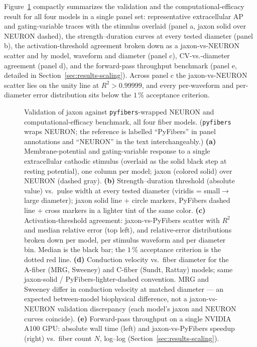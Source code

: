 Figure~\ref{fig:validation} compactly summarizes the validation and
the computational-efficacy result for all four models in a single
panel set: representative extracellular AP and gating-variable traces
with the stimulus overlaid (panel a, jaxon solid over NEURON dashed),
the strength--duration curves at every tested diameter (panel b),
the activation-threshold agreement broken down as a jaxon-vs-NEURON
scatter and by model, waveform and diameter (panel c),
CV-vs.-diameter agreement (panel d), and the forward-pass throughput
benchmark (panel e, detailed in Section~\ref{sec:results-scaling}).
Across panel c the jaxon-vs-NEURON scatter lies on the unity line at
$R^{2}>0.99999$, and every per-waveform and per-diameter error
distribution sits below the $1\,\%$ acceptance criterion.

\begin{figure}[h]
  \centering
  \caption{Validation of jaxon against \texttt{pyfibers}-wrapped NEURON
    and computational-efficacy benchmark, all four fiber models.
    (\texttt{pyfibers} wraps NEURON; the reference is labelled
    ``PyFibers'' in panel annotations and ``NEURON'' in the text
    interchangeably.)
    \textbf{(a)} Membrane-potential and gating-variable response to a
    single extracellular cathodic stimulus (overlaid as the solid
    black step at resting potential), one column per model; jaxon
    (colored solid) over NEURON (dashed gray).
    \textbf{(b)} Strength--duration threshold (absolute value) vs.\
    pulse width at every tested diameter (viridis = small$\to$large
    diameter); jaxon solid line + circle markers, PyFibers dashed line
    + cross markers in a lighter tint of the same color.
    \textbf{(c)} Activation-threshold agreement: jaxon-vs-PyFibers
    scatter with $R^{2}$ and median relative error (top left), and
    relative-error distributions broken down per model, per stimulus
    waveform and per diameter bin.  Median is the black bar; the
    $1\,\%$ acceptance criterion is the dotted red line.
    \textbf{(d)} Conduction velocity vs.\ fiber diameter for the
    A-fiber (MRG, Sweeney) and C-fiber (Sundt, Rattay) models; same
    jaxon-solid / PyFibers-lighter-dashed convention.  MRG and Sweeney
    differ in conduction velocity at matched diameter --- an expected
    between-model biophysical difference, not a jaxon-vs-NEURON
    validation discrepancy (each model's jaxon and NEURON curves
    coincide).
    \textbf{(e)} Forward-pass throughput on a single NVIDIA A100 GPU:
    absolute wall time (left) and jaxon-vs-PyFibers speedup (right)
    vs.\ fiber count $N$, log--log
    (Section~\ref{sec:results-scaling}).}
  \label{fig:validation}
\end{figure}

